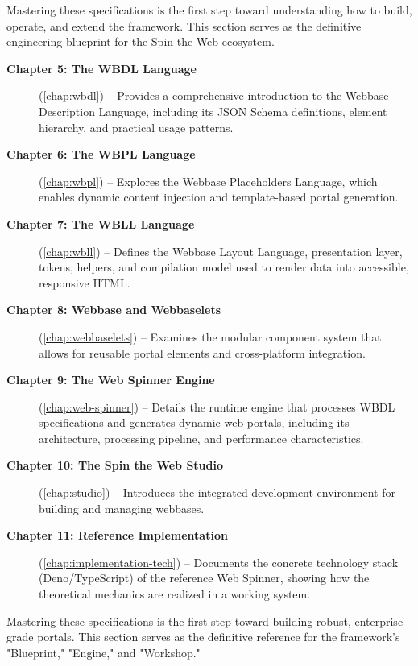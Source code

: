 Mastering these specifications is the first step toward understanding how to build, operate, and extend the framework. This section serves as the definitive engineering blueprint for the Spin the Web ecosystem.
\begin{description}
\item[\textbf{Chapter 5: The WBDL Language}] (\cref{chap:wbdl}) -- Provides a comprehensive introduction to the Webbase Description Language, including its JSON Schema definitions, element hierarchy, and practical usage patterns.

\item[\textbf{Chapter 6: The WBPL Language}] (\cref{chap:wbpl}) -- Explores the Webbase Placeholders Language, which enables dynamic content injection and template-based portal generation.

\item[\textbf{Chapter 7: The WBLL Language}] (\cref{chap:wbll}) -- Defines the Webbase Layout Language, presentation layer, tokens, helpers, and compilation model used to render data into accessible, responsive HTML.

\item[\textbf{Chapter 8: Webbase and Webbaselets}] (\cref{chap:webbaselets}) -- Examines the modular component system that allows for reusable portal elements and cross-platform integration.

\item[\textbf{Chapter 9: The Web Spinner Engine}] (\cref{chap:web-spinner}) -- Details the runtime engine that processes WBDL specifications and generates dynamic web portals, including its architecture, processing pipeline, and performance characteristics.

\item[\textbf{Chapter 10: The Spin the Web Studio}] (\cref{chap:studio}) -- Introduces the integrated development environment for building and managing webbases.

\item[\textbf{Chapter 11: Reference Implementation}] (\cref{chap:implementation-tech}) -- Documents the concrete technology stack (Deno/TypeScript) of the reference Web Spinner, showing how the theoretical mechanics are realized in a working system.
\end{description}

Mastering these specifications is the first step toward building robust, enterprise-grade portals. This section serves as the definitive reference for the framework's "Blueprint," "Engine," and "Workshop."
